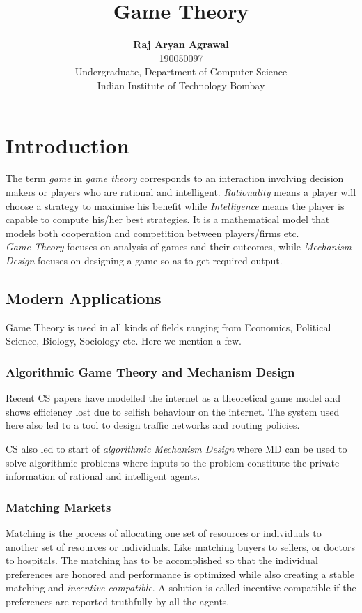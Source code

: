 \documentclass{article}
\title{Game Theory}
\author{
	\textbf{Raj Aryan Agrawal}\\
	190050097\\
	Undergraduate, Department of Computer Science\\
	Indian Institute of Technology Bombay
}
\theoremstyle{definition}
\begin{document}
\maketitle
\setcounter{tocdepth}{2}
\tableofcontents
\newpage
\section{Introduction}
The term \textit{game} in \textit{game theory} corresponds to an interaction involving decision makers or players who are rational and intelligent. \textit{Rationality} means a player will choose a strategy to maximise his benefit while \textit{Intelligence} means the player is capable to compute his/her best strategies. It is a mathematical model that models both cooperation and competition between players/firms etc.\\

\textit{Game Theory} focuses on analysis of games and their outcomes, while \textit{Mechanism Design} focuses on designing a game so as to get required output.
\subsection{Modern Applications}
Game Theory is used in all kinds of fields ranging from Economics, Political Science, Biology, Sociology etc. Here we mention a few.
\subsubsection*{Algorithmic Game Theory and Mechanism Design}
Recent CS papers have modelled the internet as a theoretical game model and shows efficiency lost due to selfish behaviour on the internet. The system used here also led to a tool to design traffic networks and routing policies.

CS also led to start of \textit{algorithmic Mechanism Design} where MD can be used to solve algorithmic problems where inputs to the problem constitute the private information of rational and intelligent agents.
\subsubsection*{Matching Markets}
Matching is the process of allocating one set of resources or individuals to another set of resources or individuals. Like matching buyers to sellers, or doctors to hospitals. The matching has to be accomplished so that the individual preferences are honored and performance is optimized while also creating a stable matching and \textit{incentive compatible}. A solution is called incentive compatible if the preferences are reported truthfully by all the agents.
\end{document}
